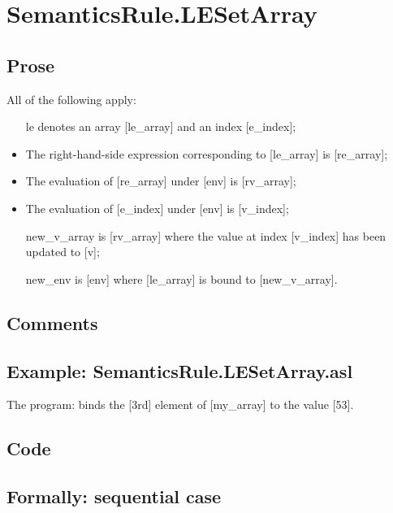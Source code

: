 \documentclass{book}
\begin{document}
\section{SemanticsRule.LESetArray \label{sec:SemanticsRule.LESetArray}}

    \subsection{Prose}
    All of the following apply:
    \begin{itemize}
    \item [le] denotes an array [le\_array] and an index [e\_index];
    \item The right-hand-side expression corresponding to [le\_array] is [re\_array];
    \item The evaluation of [re\_array] under [env] is [rv\_array];
    \item The evaluation of [e\_index] under [env] is [v\_index];
    \item [new\_v\_array] is [rv\_array] where the value at index [v\_index] has been
      updated to [v];
    \item [new\_env] is [env] where [le\_array] is bound to
      [new\_v\_array].
    \end{itemize}

    \subsection{Comments}

    \subsection{Example: SemanticsRule.LESetArray.asl}
    The program:
    binds the [3rd] element of [my\_array] to the value [53].

  \subsection{Code}

  \subsection{Formally: sequential case}
  \begin{align}
  \end{align} 
\end{document}
